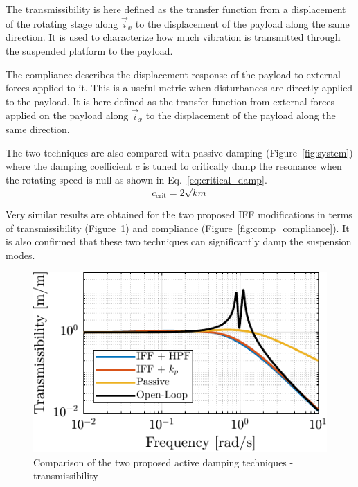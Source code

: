 \documentclass[10pt]{iopart}
\begin{document}
The transmissibility is here defined as the transfer function from a displacement of the rotating stage along \(\vec{i}_x\) to the displacement of the payload along the same direction.
It is used to characterize how much vibration is transmitted through the suspended platform to the payload.

The compliance describes the displacement response of the payload to external forces applied to it.
This is a useful metric when disturbances are directly applied to the payload.
It is here defined as the transfer function from external forces applied on the payload along \(\vec{i}_x\) to the displacement of the payload along the same direction.

The two techniques are also compared with passive damping (Figure~\ref{fig:system}) where the damping coefficient \(c\) is tuned to critically damp the resonance when the rotating speed is null as shown in Eq.~\eqref{eq:critical_damp}.
\begin{equation}
\label{eq:critical_damp}
  c_\text{crit} = 2 \sqrt{k m}
\end{equation}

Very similar results are obtained for the two proposed IFF modifications in terms of transmissibility (Figure~\ref{fig:comp_transmissibility}) and compliance (Figure~\ref{fig:comp_compliance}).
It is also confirmed that these two techniques can significantly damp the suspension modes.

\begin{figure}[htbp]
\centering
\includegraphics[scale=1,scale=1]{figs/fig18.pdf}
\caption{\label{fig:comp_transmissibility}Comparison of the two proposed active damping techniques - transmissibility}
\end{figure}
\end{document}
